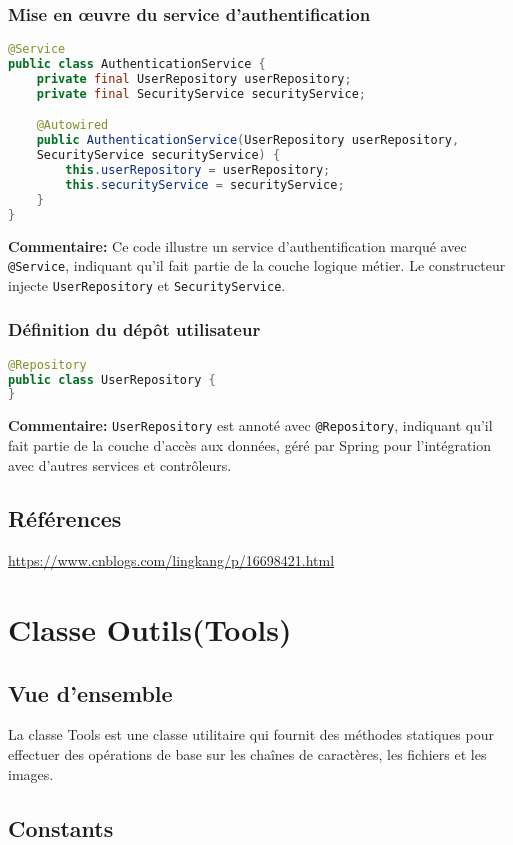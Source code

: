 \documentclass{article}
\begin{document}
\subsubsection{Mise en œuvre du service d'authentification}
\begin{lstlisting}[language=Java]
@Service
public class AuthenticationService {
    private final UserRepository userRepository;
    private final SecurityService securityService;

    @Autowired
    public AuthenticationService(UserRepository userRepository, 
    SecurityService securityService) {
        this.userRepository = userRepository;
        this.securityService = securityService;
    }
}
\end{lstlisting}
\textbf{Commentaire:} Ce code illustre un service d'authentification marqué avec \texttt{@Service}, indiquant qu'il fait partie de la couche logique métier. Le constructeur injecte \texttt{UserRepository} et \texttt{SecurityService}.

\subsubsection{Définition du dépôt utilisateur}
\begin{lstlisting}[language=Java]
@Repository
public class UserRepository {
}
\end{lstlisting}
\textbf{Commentaire:} \texttt{UserRepository} est annoté avec \texttt{@Repository}, indiquant qu'il fait partie de la couche d'accès aux données, géré par Spring pour l'intégration avec d'autres services et contrôleurs.

\subsection{Références}
\href{https://www.cnblogs.com/lingkang/p/16698421.html}{https://www.cnblogs.com/lingkang/p/16698421.html}

\section{Classe Outils(Tools)}
\subsection{Vue d'ensemble}
La classe Tools est une classe utilitaire qui fournit des méthodes statiques pour effectuer des opérations de base sur les chaînes de caractères, les fichiers et les images.
\subsection{Constants}
\end{document}
